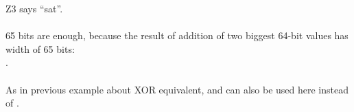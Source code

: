 Z3 says ``sat''.\\
\\
65 bits are enough, because the result of addition of two biggest 64-bit values has width of 65 bits: \\
.\\
\\
As in previous example about XOR equivalent,  and  can also be used here instead of .

